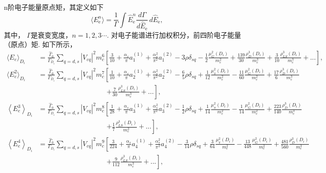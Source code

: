       n阶电子能量原点矩，其定义如下
      \begin{equation}
        \langle E_{\mathrm{e}}^{n} \rangle = \frac{1}{\Gamma} \int \hat{E}_{\mathrm{e}}^{n} \frac{d \Gamma}{d \hat{E}_{\mathrm{e}}} \, d \hat{E}_{\mathrm{e}},
\end{equation}
      其中， $\Gamma$是衰变宽度，$n=1, 2, 3\cdots$.
      对电子能谱进行加权积分，前四阶电子能量（原点）矩.
      如下所示，
      {\scriptsize
      \begin{equation}
        \begin{aligned}
            \langle E_{e}\rangle_{D_{i}}&=\frac{\hat{\Gamma}_0}{    \Gamma_{D_{i}}}\sum_{q=d,s} \left|V_{cq}\right|^2 m_{c}^6 \left[\frac{3}{10} + \frac{\alpha_{s}}{\pi} a_1^{(1)} + \frac{\alpha_s^2}{\pi^2}a_1^{(2)} -3\rho\delta_{sq} -\frac{1}{2}\frac{\mu_{G}^{2}(D_{i})}{m_{c}^{2}} +\frac{139}{30} \frac{\rho_D^3\left(D_{i}\right)}{m_c^3}+\frac{3}{10} \frac{\rho_{L S}^3\left(D_{i}\right)}{m_c^3}+ ...\right],\\
            \langle E_{e}^{2} \rangle_{D_{i}} &=\frac{\hat{\Gamma}_0}{\Gamma_{D_{i}}} \sum_{q=d,s}\left|V_{cq}\right|^2 m_c^7 \left[ \frac{1}{10} + \frac{\alpha_{s}}{\pi} a_2^{(1)}  + \frac{\alpha_s^2}{\pi^2}a_2^{(2)}  - \frac{6}{5} \rho\delta_{sq} + \frac{1}{12}\frac{\mu_{\pi}^2(D_{i})}{ m_c^2} - \frac{11}{60}\frac{\mu_G^2(D_{i})}{ m_c^2} +\frac{17}{6} \frac{\rho_D^3\left(D_{i}\right)}{m_c^3} \right.\nonumber \\
            &\qquad\qquad\qquad\qquad\qquad \left. +\frac{7}{30} \frac{\rho_{L S}^3\left(D_{i}\right)}{m_c^3}+ ... \right], \nonumber\\
            \left\langle E_e^3\right\rangle_{D_{i}}&=\frac{\hat{\Gamma}_0}{\Gamma_{D_{i}}}\sum_{q=d,s}\left|V_{cq}\right|^2 m_c^8\left[\frac{1}{28} + \frac{\alpha_{s}}{\pi} a_3^{(1)}  + \frac{\alpha_s^2}{\pi^2}a_3^{(2)}  -\frac{1}{2} \rho\delta_{sq} +\frac{1}{14} \frac{\mu_\pi^2\left(D_{i}\right)}{ m_c^2}-\frac{1}{14} \frac{\mu_G^2\left(D_{i}\right)}{ m_c^2}+\frac{223}{140} \frac{\rho_D^3\left(D_{i}\right)}{m_c^3}\right. \nonumber\\
            &\qquad\qquad\qquad\qquad\qquad \left.+\frac{1}{7} \frac{\rho_{L S}^3\left(D_{i}\right)}{m_c^3} + ... \right],\nonumber\\
            \left\langle E_e^4\right\rangle_{D_i}&=\frac{\hat{\Gamma}_0}{\Gamma_{D_{i}}}\sum_{q=d,s}\left|V_{cq}\right|^2 m_c^9\left[\frac{3}{224} + \frac{\alpha_{s}}{\pi} a_4^{(1)}  + \frac{\alpha_s^2}{\pi^2}a_4^{(2)}  -\frac{3}{14} \rho\delta_{sq} +\frac{3}{64} \frac{\mu_\pi^2\left(D_{i}\right)}{ m_c^2}-\frac{13}{448} \frac{\mu_G^2\left(D_{i}\right)}{ m_c^2} +\frac{481}{560} \frac{\rho_D^3\left(D_i\right)}{m_c^3}\right. \nonumber\\
            &\qquad\qquad\qquad\qquad\qquad \left.+\frac{9}{112} \frac{\rho_{L S}^3\left(D_i\right)}{m_c^3}+ ... \right],\nonumber
            \end{aligned}
            \label{eq:inital_moments}
      \end{equation}
      }
